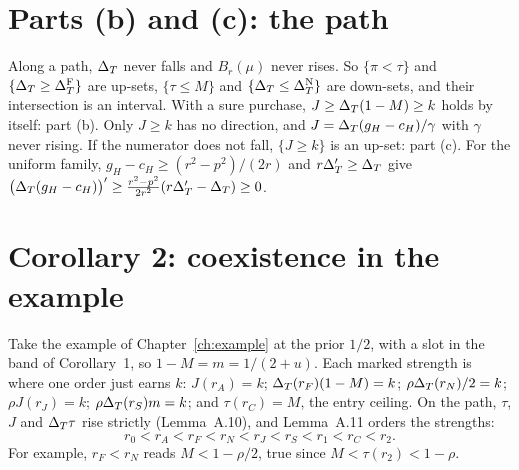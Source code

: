 \section{Parts (b) and (c): the path}\label{sec:coexistence-proof-b}

Along a path, \(\Delta_T\) never falls and \(B_r(\mu)\) never rises. So \(\{\pi<\tau\}\) and \(\{\Delta_T\ge\Delta_T^{\rm F}\}\) are
up-sets, \(\{\tau\le M\}\) and \(\{\Delta_T\le\Delta_T^{\rm N}\}\) are down-sets, and their intersection is an interval. With a
sure purchase, \(J\ge\Delta_T(1-M)\ge k\) holds by itself: part (b). Only \(J\ge k\) has no direction, and
\(J=\Delta_T(g_H-c_H)/\gamma\) with \(\gamma\) never rising. If the numerator does not fall, \(\{J\ge k\}\) is an up-set:
part (c). For the uniform family, \(g_H-c_H\ge(r^2-p^2)/(2r)\) and \(r\Delta_T'\ge\Delta_T\) give
\(\bigl(\Delta_T(g_H-c_H)\bigr)'\ge\frac{r^2-p^2}{2r^2}(r\Delta_T'-\Delta_T)\ge0\).

\section{Corollary 2: coexistence in the example}\label{sec:coexistence-example}

Take the example of Chapter~\ref{ch:example} at the prior \(1/2\), with a slot in the band of Corollary~1, so
\(1-M=m=1/(2+u)\). Each marked strength is where one order just earns \(k\): \(J(r_A)=k\);
\(\Delta_T(r_F)(1-M)=k\); \(\rho\Delta_T(r_N)/2=k\); \(\rho J(r_J)=k\); \(\rho\Delta_T(r_S)m=k\); and \(\tau(r_C)=M\), the entry ceiling.
On the path, \(\tau\), \(J\) and \(\Delta_T\tau\) rise strictly (Lemma~A.10), and Lemma~A.11 orders the strengths:
\[
r_0<r_A<r_F<r_N<r_J<r_S<r_1<r_C<r_2 .
\]
For example, \(r_F<r_N\) reads \(M<1-\rho/2\), true since \(M<\tau(r_2)<1-\rho\).


